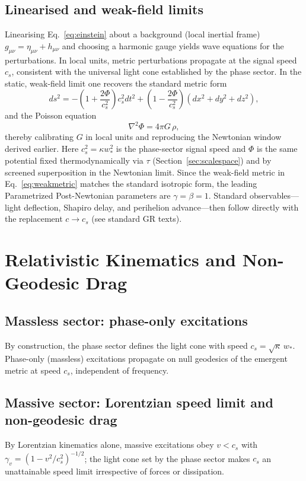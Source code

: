 \documentclass[11pt]{article}
\begin{document}
\subsection{Linearised and weak-field limits}
Linearising Eq.~\eqref{eq:einstein} about a background (local inertial frame) $g_{\mu\nu}=\eta_{\mu\nu}+h_{\mu\nu}$ and choosing a harmonic gauge yields wave equations for the perturbations. In local units, metric perturbations propagate at the signal speed $c_s$, consistent with the universal light cone established by the phase sector. In the static, weak-field limit one recovers the standard metric form
\begin{equation}
  ds^2 = -\left(1+\frac{2\Phi}{c_s^2}\right) c_s^2 dt^2 + \left(1-\frac{2\Phi}{c_s^2}\right)(dx^2+dy^2+dz^2),\label{eq:weakmetric}
\end{equation}
and the Poisson equation
\begin{equation}
  \nabla^2 \Phi = 4\pi G\,\rho,
\end{equation}
thereby calibrating $G$ in local units and reproducing the Newtonian window derived earlier. Here $c_s^2 = \kappa w_*^2$ is the phase-sector signal speed and $\Phi$ is the same potential fixed thermodynamically via $\tau$ (Section~\ref{sec:scalespace}) and by screened superposition in the Newtonian limit. Since the weak-field metric in Eq.~\eqref{eq:weakmetric} matches the standard isotropic form, the leading Parametrized Post-Newtonian parameters are $\gamma=\beta=1$. Standard observables—light deflection, Shapiro delay, and perihelion advance—then follow directly with the replacement $c\to c_s$ (see standard GR texts).

\section{Relativistic Kinematics and Non-Geodesic Drag}\label{sec:kinematics}
\subsection{Massless sector: phase-only excitations}
By construction, the phase sector defines the light cone with speed $c_s = \sqrt{\kappa}\,w_*$. Phase-only (massless) excitations propagate on null geodesics of the emergent metric at speed $c_s$, independent of frequency.

\subsection{Massive sector: Lorentzian speed limit and non-geodesic drag}
By Lorentzian kinematics alone, massive excitations obey $v<c_s$ with $\gamma_v=(1-v^2/c_s^2)^{-1/2}$; the light cone set by the phase sector makes $c_s$ an unattainable speed limit irrespective of forces or dissipation.
\end{document}
